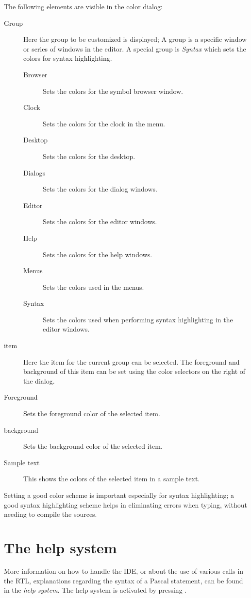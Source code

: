 The following elements are visible in the color dialog:
\begin{description}
\item[Group]
Here the group to be customized is displayed; A group is a specific window
or series of windows in the editor. A special group is {\em Syntax} which
sets the colors for syntax highlighting.
\begin{description}
\item[Browser] Sets the colors for the symbol browser window.
\item[Clock] Sets the colors for the clock in the menu.
\item[Desktop] Sets the colors for the desktop.
\item[Dialogs] Sets the colors for the dialog windows.
\item[Editor] Sets the colors for the editor windows.
\item[Help] Sets the colors for the help windows.
\item[Menus] Sets the colors used in the menus.
\item[Syntax] Sets the colors used when performing syntax highlighting in the
editor windows.
\end{description}
\item[item]
Here the item for the current group can be selected. The foreground and
background of this item can be set using the color selectors on the right of
the dialog.
\item[Foreground]
Sets the foreground color of the selected item. 
\item[background]
Sets the background color of the selected item.
\item[Sample text]
This shows the colors of the selected item in a sample text.
\end{description}
Setting a good color scheme is important especially for syntax highlighting;
a good syntax highlighting scheme helps in eliminating errors when typing,
without needing to compile the sources. 

\section{The help system}

More information on how to handle the IDE, or about the use of various
calls in the RTL, explanations regarding the syntax of a Pascal statement,
can be found in the \emph{help system}. The help system is activated
by pressing .

